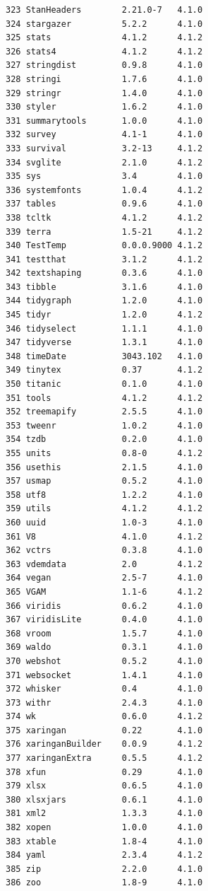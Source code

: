 \documentclass[
  a4paper,
  pandoc,
  ja=standard,
  jafont=haranoaji]{bxjsbook}
\begin{document}
\begin{verbatim}
323 StanHeaders        2.21.0-7   4.1.0
324 stargazer          5.2.2      4.1.0
325 stats              4.1.2      4.1.2
326 stats4             4.1.2      4.1.2
327 stringdist         0.9.8      4.1.0
328 stringi            1.7.6      4.1.0
329 stringr            1.4.0      4.1.0
330 styler             1.6.2      4.1.0
331 summarytools       1.0.0      4.1.0
332 survey             4.1-1      4.1.0
333 survival           3.2-13     4.1.2
334 svglite            2.1.0      4.1.2
335 sys                3.4        4.1.0
336 systemfonts        1.0.4      4.1.2
337 tables             0.9.6      4.1.0
338 tcltk              4.1.2      4.1.2
339 terra              1.5-21     4.1.2
340 TestTemp           0.0.0.9000 4.1.2
341 testthat           3.1.2      4.1.2
342 textshaping        0.3.6      4.1.0
343 tibble             3.1.6      4.1.0
344 tidygraph          1.2.0      4.1.0
345 tidyr              1.2.0      4.1.2
346 tidyselect         1.1.1      4.1.0
347 tidyverse          1.3.1      4.1.0
348 timeDate           3043.102   4.1.0
349 tinytex            0.37       4.1.2
350 titanic            0.1.0      4.1.0
351 tools              4.1.2      4.1.2
352 treemapify         2.5.5      4.1.0
353 tweenr             1.0.2      4.1.0
354 tzdb               0.2.0      4.1.0
355 units              0.8-0      4.1.2
356 usethis            2.1.5      4.1.0
357 usmap              0.5.2      4.1.0
358 utf8               1.2.2      4.1.0
359 utils              4.1.2      4.1.2
360 uuid               1.0-3      4.1.0
361 V8                 4.1.0      4.1.2
362 vctrs              0.3.8      4.1.0
363 vdemdata           2.0        4.1.2
364 vegan              2.5-7      4.1.0
365 VGAM               1.1-6      4.1.2
366 viridis            0.6.2      4.1.0
367 viridisLite        0.4.0      4.1.0
368 vroom              1.5.7      4.1.0
369 waldo              0.3.1      4.1.0
370 webshot            0.5.2      4.1.0
371 websocket          1.4.1      4.1.0
372 whisker            0.4        4.1.0
373 withr              2.4.3      4.1.0
374 wk                 0.6.0      4.1.2
375 xaringan           0.22       4.1.0
376 xaringanBuilder    0.0.9      4.1.2
377 xaringanExtra      0.5.5      4.1.2
378 xfun               0.29       4.1.0
379 xlsx               0.6.5      4.1.0
380 xlsxjars           0.6.1      4.1.0
381 xml2               1.3.3      4.1.0
382 xopen              1.0.0      4.1.0
383 xtable             1.8-4      4.1.0
384 yaml               2.3.4      4.1.2
385 zip                2.2.0      4.1.0
386 zoo                1.8-9      4.1.0
\end{verbatim}

\renewcommand\bibname{参考文献}
  
\end{document}
